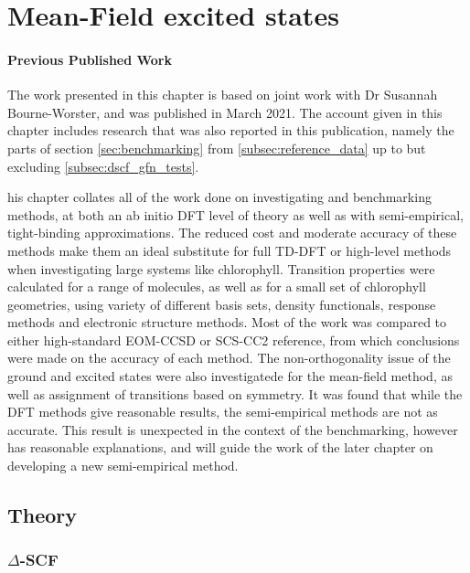 %
%
\chapter{Mean-Field excited states}
\label{chap:dscf}

\subsubsection*{Previous Published Work}
The work presented in this chapter is based on joint work with Dr Susannah Bourne-Worster,
and was published in March 2021\cite{Worster2021}. The account given in this 
chapter includes research that was also reported in this publication, namely the
parts of section \ref{sec:benchmarking} from \ref{subsec:reference_data} up to
but excluding \ref{subsec:dscf_gfn_tests}.

his chapter collates all of the work done on investigating and benchmarking
\dscf methods, at both an ab initio DFT level of theory as well as with semi-empirical, 
tight-binding approximations. The reduced cost and moderate accuracy of these methods
make them an ideal substitute for full TD-DFT or high-level methods when investigating
large systems like chlorophyll.
Transition properties were calculated for a range of molecules, as well as
for a small set of chlorophyll geometries, using variety of different basis sets,
density functionals, response methods and electronic structure methods. Most of 
the work was compared to either high-standard EOM-CCSD or SCS-CC2 reference, from
which conclusions were made on the accuracy of each method. The non-orthogonality 
issue of the ground and excited states were also investigatede for the mean-field 
\dscf method, as well as assignment of transitions based on symmetry. 
It was found that while the DFT methods give reasonable results, the semi-empirical
\dscf methods are not as accurate. This result is unexpected in the context of
the benchmarking, however has reasonable explanations, and will guide the work
of the later chapter on developing a new semi-empirical method.

\section{Theory}
\label{sec:dscf_theory}
\subsection{$\Delta$-SCF}
\label{subsec{dscf_and_eigdiff}}

